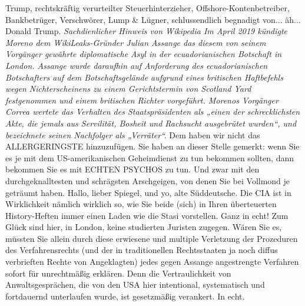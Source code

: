 \begin{multicols}{2}
{Trump, rechtskräftig verurteilter Steuerhinterzieher,
Offshore-Kontenbetreiber, Bankbetrüger, Verschwörer,
Lump \& Lügner, schlussendlich begnadigt von... äh...
Donald Trump.\textCR
\textit{Sachdienlicher Hinweis von Wikipedia \linebreak
Im April 2019 kündigte Moreno dem WikiLeaks-Gründer
Julian Assange das diesem von seinem Vorgänger gewährte diplomatische Asyl in der ecuadorianischen Botschaft
in London. Assange wurde daraufhin auf Anforderung
des ecuadorianischen Botschafters auf dem Botschaftsgelände aufgrund eines britischen Haftbefehls wegen
Nichterscheinens zu einem Gerichtstermin von Scotland
Yard festgenommen und einem britischen Richter vorgeführt. Morenos Vorgänger Correa wertete das Verhalten
des Staatspräsidenten als „einen der schrecklichsten Akte,
die jemals aus Servilität, Bosheit und Rachsucht ausgebrütet wurden“, und bezeichnete seinen Nachfolger als
„Verräter“.}\textCR
Dem haben wir nicht das ALLERGERINGSTE hinzuzufügen.\textCR
Sie haben an dieser Stelle gemerkt: wenn Sie es je mit
dem US-amerikanischen Geheimdienst zu tun bekommen sollten, dann bekommen Sie es mit ECHTEN PSYCHOS zu tun. Und zwar mit den durchgeknalltesten und
schrägsten Arschgeigen, von denen Sie bei Vollmond je
geträumt haben. Hallo, lieber Spiegel, und yo, alte Süddeutsche. Die CIA ist in Wirklichkeit nämlich wirklich so,
wie Sie beide (sich) in Ihren überteuerten History-Heften immer einen Laden wie die Stasi vorstellen. Ganz in
echt!\textCR
Zum Glück sind hier, in London, keine studierten Juristen zugegen. Wären Sie es, müssten Sie allein durch
diese erwiesene und multiple Verletzung der Prozeduren
des Verfahrensrechts (und der in traditionellen Rechtsstaaten ja noch diffus verbrieften Rechte von Angeklagten) jedes gegen Assange angestrengte Verfahren sofort
für unrechtmäßig erklären. Denn die Vertraulichkeit von
Anwaltsgesprächen, die von den USA hier intentional,
systematisch und fortdauernd unterlaufen wurde, ist
gesetzmäßig verankert. In echt.}


\end{multicols}
